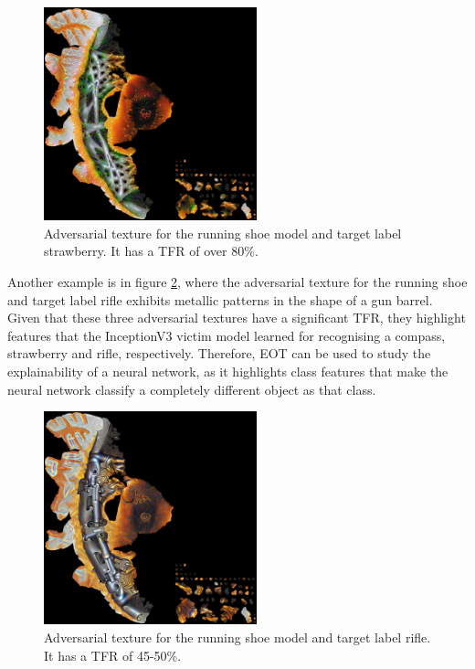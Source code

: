 \begin{figure}[H]
    \centering
    \includegraphics[width=0.55\textwidth]{graphics/running shoe strawberry.jpg}
    \caption[Adversarial texture for the running shoe model and target label strawberry.]{Adversarial texture for the running shoe model and target label strawberry. It has a TFR of over 80\%.}
    \label{fig:running_shoe_strawberry}
\end{figure}

Another example is in figure \ref{fig:running_shoe_rifle}, where the adversarial texture for the running shoe and target label rifle exhibits metallic patterns in the shape of a gun barrel. Given that these three adversarial textures have a significant TFR, they highlight features that the InceptionV3 victim model learned for recognising a compass, strawberry and rifle, respectively. Therefore, EOT can be used to study the explainability of a neural network, as it highlights class features that make the neural network classify a completely different object as that class.

\begin{figure}[H]
    \centering
    \includegraphics[width=0.55\textwidth]{graphics/running shoe rifle.jpg}
    \caption[Adversarial texture for the running shoe model and target label rifle.]{Adversarial texture for the running shoe model and target label rifle. It has a TFR of 45-50\%.}
    \label{fig:running_shoe_rifle}
\end{figure}

